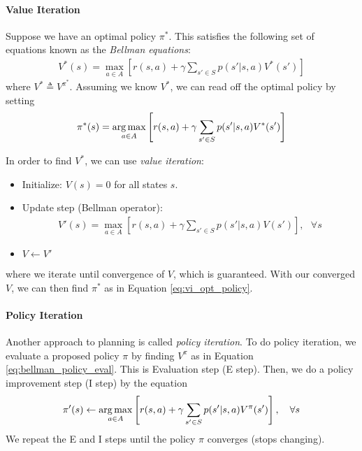 \documentclass[12pt]{article}
\begin{document}
\paragraph{Value Iteration}

Suppose we have an optimal policy $\pi^*$. This satisfies the following set of equations known as the \emph{Bellman equations}:
\begin{align}V^*(s) = \max_{a \in A} \left[r(s,a) + \gamma \sum_{s' \in S} p(s' | s, a) V^*(s')\right] \end{align}
where $V^* \triangleq V^{\pi^*}$. Assuming we know $V^*$, we can read off the optimal policy
by setting 
\begin{align}
\pi^{*}(s) = \argmax_{a \in A}\left[r(s, a) + \gamma \sum_{s' \in S} p(s'|s, a) V^\ast(s') \right] \label{eq:vi_opt_policy}
\end{align}

\noindent In order to find $V^*$, we can use \emph{value iteration}:

\begin{itemize}
    \item Initialize: $V(s) = 0$ for all states $s$.
    \item Update step (Bellman operator):
    \begin{align}
    V'(s) = \max_{a\in A}\left[r(s,a) + \gamma\sum_{s'\in S}p(s'|s,a)V(s')\right], \text{  } \forall s
    \end{align}
    \item $V \leftarrow V'$
\end{itemize}
where we iterate until convergence of $V$, which is guaranteed. With our converged $V$, we can then find $\pi^*$ as in Equation \ref{eq:vi_opt_policy}.

\vspace{.5pc}

\paragraph{Policy Iteration}

\noindent Another approach to planning is called \textit{policy iteration}. To do policy iteration, we evaluate a proposed policy $\pi$ by finding $V^\pi$ as in Equation \ref{eq:bellman_policy_eval}. This is Evaluation step (E step).
Then, we do a policy improvement step (I step) by the equation
\begin{equation}
\pi'(s) \gets \argmax_{a \in A} \left[ r(s,a) + \gamma \sum_{s' \in S} p(s'|s,a)V^\pi(s') \right], \quad \forall s
\end{equation}
We repeat the E and I steps until the policy $\pi$ converges (stops changing).
\end{document}
